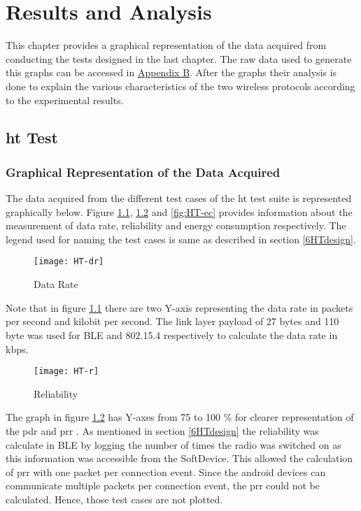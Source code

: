 \chapter{Results and Analysis}
This chapter provides a graphical representation of the data acquired from conducting the tests designed in the last chapter. The raw data used to generate this graphs can be accessed in \hyperref[AppendixB]{Appendix B}. After the graphs their analysis is done to explain the various characteristics of the two wireless protocols according to the experimental results.

\section{\acrlong{ht} Test}
\subsection{Graphical Representation of the Data Acquired}
The data acquired from the different test cases of the \gls{ht} test suite is represented graphically below. Figure \ref{fig:HT-dr}, \ref{fig:HT-r} and \ref{fig:HT-ec} provides information about the measurement of data rate, reliability and energy consumption respectively. The legend used for naming the test cases is same as described in section \ref{6HTdesign}.

\begin{figure}[h]
\texttt{[image: HT-dr]}
\caption{Data Rate}
\label{fig:HT-dr}
\vspace{-6 pt}
\end{figure}

Note that in figure \ref{fig:HT-dr} there are two Y-axis representing the data rate in packets per second and kilobit per second. The link layer payload of 27 bytes and 110 byte was used for BLE and 802.15.4 respectively to calculate the data rate in kbps.

\begin{figure}[h]
\texttt{[image: HT-r]}
\caption{Reliability}
\label{fig:HT-r}
\vspace{-6 pt}
\end{figure}
The graph in figure \ref{fig:HT-r} has Y-axes from 75 to 100 \% for clearer representation of the \gls{pdr} and \gls{prr} . As mentioned in section \ref{6HTdesign} the reliability was calculate in BLE by logging the number of times the radio was switched on as this information was accessible from the SoftDevice. This allowed the calculation of \gls{prr} with one packet per connection event. Since the android devices can communicate multiple packets per connection event, the \gls{prr} could not be calculated. Hence, those test cases are not plotted.

